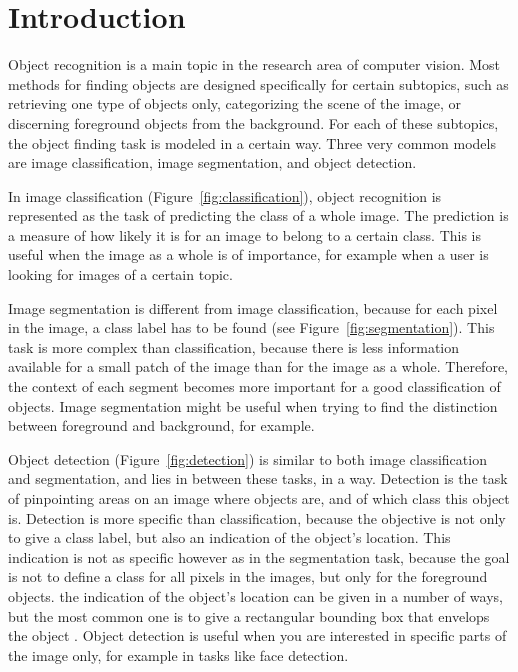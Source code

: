 \chapter{Introduction} %
\label{cha:introduction}

Object recognition is a main topic in the research area of computer vision. Most methods for finding objects are designed specifically for certain subtopics, such as retrieving one type of objects only, categorizing the scene of the image, or discerning foreground objects from the background. For each of these subtopics, the object finding task is modeled in a certain way. Three very common models are image classification, image segmentation, and object detection.

In image classification (Figure~\ref{fig:classification}), object recognition is represented as the task of predicting the class of a whole image. The prediction is a measure of how likely it is for an image to belong to a certain class. This is useful when the image as a whole is of importance, for example when a user is looking for images of a certain topic.

Image segmentation is different from image classification, because for each pixel in the image, a class label has to be found (see Figure~\ref{fig:segmentation}). This task is more complex than classification, because there is less information available for a small patch of the image than for the image as a whole. Therefore, the context of each segment becomes more important for a good classification of objects. Image segmentation might be useful when trying to find the distinction between foreground and background, for example.

Object detection (Figure~\ref{fig:detection}) is similar to both image classification and segmentation, and lies in between these tasks, in a way. Detection is the task of pinpointing areas on an image where objects are, and of which class this object is. Detection is more specific than classification, because the objective is not only to give a class label, but also an indication of the object's location. This indication is not as specific however as in the segmentation task, because the goal is not to define a class for all pixels in the images, but only for the foreground objects. the indication of the object's location can be given in a number of ways, but the most common one is to give a rectangular bounding box that envelops the object \cite{pascal-voc-2007}. Object detection is useful when you are interested in specific parts of the image only, for example in tasks like face detection.

